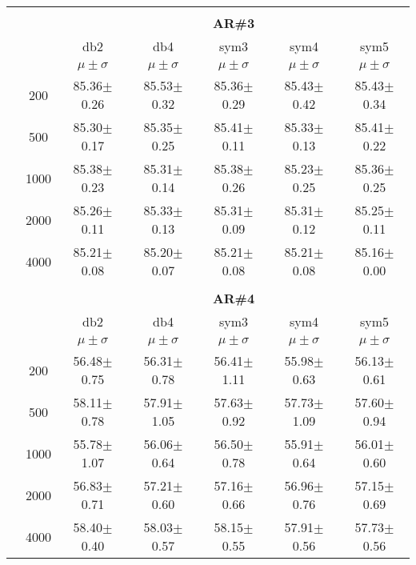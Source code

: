 \begin{table}[H]
\begin{tabular}{|c|c|c c c c c|}
	

 \\ \midrule
\multicolumn{7}{c}{}\\ 



\cline{3-7}
\multicolumn{2}{c|}{\multirow{3}{*}{}} & \multicolumn{5}{c|}{\textbf{AR\#3}}   \\\cline{3-7} 
\multicolumn{2}{c|}{}  & db2 & db4 & sym3 & sym4 & sym5 \\\cline{3-7}%
\multicolumn{2}{c|}{}& $\mu \pm \sigma$ & $\mu \pm \sigma$ & $\mu \pm \sigma$ & $\mu \pm \sigma$ & $\mu \pm \sigma$ \\\hline

\multicolumn{1}{|c|}{ \multirow{5}{*}{\rotatebox[origin=c]{90}{\textbf{Neurônios}}} }
&200	&85.36$\pm$0.26	&85.53$\pm$0.32	&85.36$\pm$0.29	&85.43$\pm$0.42	&85.43$\pm$0.34	\\\cline{2-7}
&500	&85.30$\pm$0.17	&85.35$\pm$0.25	&85.41$\pm$0.11	&85.33$\pm$0.13	&85.41$\pm$0.22	\\\cline{2-7}
&1000	&85.38$\pm$0.23	&85.31$\pm$0.14	&85.38$\pm$0.26	&85.23$\pm$0.25	&85.36$\pm$0.25	\\\cline{2-7}
&2000	&85.26$\pm$0.11	&85.33$\pm$0.13	&85.31$\pm$0.09	&85.31$\pm$0.12	&85.25$\pm$0.11	\\\cline{2-7}
&4000	&85.21$\pm$0.08 &85.20$\pm$0.07	&85.21$\pm$0.08	&85.21$\pm$0.08	&85.16$\pm$0.00	
\\\midrule

\multicolumn{7}{c}{}\\ 



\cline{3-7}
\multicolumn{2}{c|}{\multirow{3}{*}{}} & \multicolumn{5}{c|}{\textbf{AR\#4}}   \\\cline{3-7} 
\multicolumn{2}{c|}{}  & db2 & db4 & sym3 & sym4 & sym5 \\\cline{3-7}%
\multicolumn{2}{c|}{}& $\mu \pm \sigma$ & $\mu \pm \sigma$ & $\mu \pm \sigma$ & $\mu \pm \sigma$ & $\mu \pm \sigma$ \\\hline
\multicolumn{1}{|c|}{ \multirow{5}{*}{\rotatebox[origin=c]{90}{\textbf{Neurônios}}} }
&200	&56.48$\pm$0.75	&56.31$\pm$0.78	&56.41$\pm$1.11	&55.98$\pm$0.63	&56.13$\pm$0.61	\\\cline{2-7}
&500	&58.11$\pm$0.78	&57.91$\pm$1.05	&57.63$\pm$0.92 &57.73$\pm$1.09	&57.60$\pm$0.94	\\\cline{2-7}
&1000	&55.78$\pm$1.07	&56.06$\pm$0.64	&56.50$\pm$0.78	&55.91$\pm$0.64	&56.01$\pm$0.60	\\\cline{2-7}
&2000	&56.83$\pm$0.71	&57.21$\pm$0.60	&57.16$\pm$0.66	&56.96$\pm$0.76 &57.15$\pm$0.69	\\\cline{2-7}
&4000	&58.40$\pm$0.40	&58.03$\pm$0.57	&58.15$\pm$0.55	&57.91$\pm$0.56	&57.73$\pm$0.56	

 \\\midrule
\end{tabular}
\end{table}
